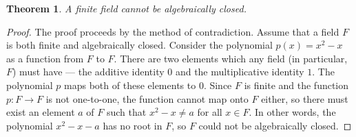 \documentclass[12pt]{article}
\newtheorem*{theorem}{Theorem}
\begin{document}
\begin{theorem}
A finite field cannot be algebraically closed.
\end{theorem}

\begin{proof}
The proof proceeds by the method of contradiction.  Assume that a field
$F$ is both finite and algebraically closed.  Consider the polynomial 
$p(x) = x^2 - x$ as a function from $F$ to $F$.  There are two elements
which any field (in particular, $F$) must have --- the additive identity
$0$ and the multiplicative identity $1$.  The polynomial $p$ maps both of
these elements to $0$.  Since $F$ is finite and the function $p \colon F
\to F$ is not one-to-one, the function cannot map onto $F$ either, so
there must exist an element $a$ of $F$ such that $x^2 - x \not= a$ for
all $x \in F$.  In other words, the polynomial $x^2 - x - a$ has no root
in $F$, so $F$ could not be algebraically closed.
\end{proof}
\end{document}
